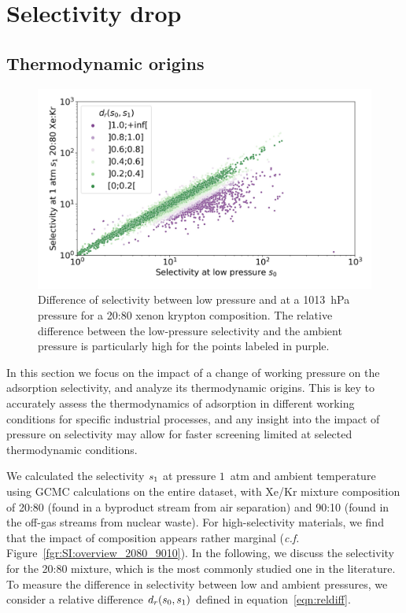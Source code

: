 \documentclass[main.tex]{subfiles}
\begin{document}

\section{Selectivity drop}

\subsection{Thermodynamic origins}\label{section:pressure}

\begin{figure}[t]
  \centering
    \includegraphics[width=0.6\linewidth]{figures/2-thermo/s_0_vs_s_2080_overview_log.jpg}
    \caption{Difference of selectivity between low pressure and at a \SI{1013}{\hecto\pascal} pressure for a 20:80 xenon krypton composition. The relative difference between the low-pressure selectivity and the ambient pressure is particularly high for the points labeled in purple.}
    \label{fgr:overview}
\end{figure}

In this section we focus on the impact of a change of working pressure on the adsorption selectivity, and analyze its thermodynamic origins. This is key to accurately assess the thermodynamics of adsorption in different working conditions for specific industrial processes, and any insight into the impact of pressure on selectivity may allow for faster screening limited at selected thermodynamic conditions.

We calculated the selectivity $s_{\text{1}}$ at pressure $1$~atm and ambient temperature using GCMC calculations on the entire dataset, with Xe/Kr mixture composition of 20:80 (found in a byproduct stream from air separation\cite{kerry2007industrial}) and 90:10 (found in the off-gas streams from nuclear waste\cite{auerbach2003handbook}). For high-selectivity materials, we find that the impact of composition appears rather marginal (\emph{c.f.} Figure~\ref{fgr:SI:overview_2080_9010}). In the following, we discuss the selectivity for the 20:80 mixture, which is the most commonly studied one in the literature. To measure the difference in selectivity between low and ambient pressures, we consider a relative difference $d_r(s_{\text{0}},s_{\text{1}})$ defined in equation~\ref{eqn:reldiff}.
\end{document}
